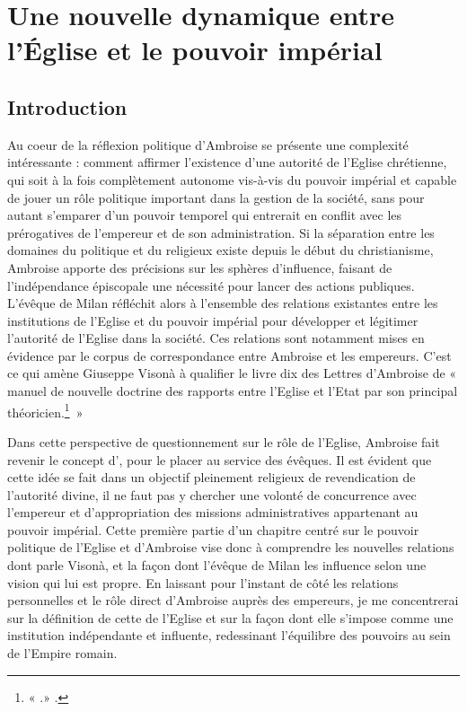 \section{Une nouvelle dynamique entre l'Église et le pouvoir impérial}

\subsection*{Introduction}

    Au coeur de la réflexion politique d’Ambroise se présente une complexité intéressante : comment affirmer l'existence d’une autorité de l’Eglise chrétienne, qui soit à la fois complètement autonome vis-à-vis du pouvoir impérial et capable de jouer un rôle politique important dans la gestion de la société, sans pour autant s'emparer d’un pouvoir temporel qui entrerait en conflit avec les prérogatives de l’empereur et de son administration. Si la séparation entre les domaines du politique et du religieux existe depuis le début du christianisme, Ambroise apporte des précisions sur les sphères d’influence, faisant de l’indépendance épiscopale une nécessité pour lancer des actions publiques. L’évêque de Milan réfléchit alors à l’ensemble des relations existantes entre les institutions de l’Eglise et du pouvoir impérial pour développer et légitimer l’autorité de l’Eglise dans la société. Ces relations sont notamment mises en évidence par le corpus de correspondance entre Ambroise et les empereurs. C’est ce qui amène Giuseppe Visonà à qualifier le livre dix des Lettres d'Ambroise de « manuel de nouvelle doctrine des rapports entre l’Eglise et l’Etat par son principal théoricien.\footnote{« .» \cite[33]{pizzolato_nec_timeo}.}~»

\bigskip

Dans cette perspective de questionnement sur le rôle de l’Eglise, Ambroise fait revenir le concept d’, pour le placer au service des évêques. Il est évident que cette idée se fait dans un objectif pleinement religieux de revendication de l’autorité divine, il ne faut pas y chercher une volonté de concurrence avec l’empereur et d’appropriation des missions administratives appartenant au pouvoir impérial. Cette première partie d’un chapitre centré sur le pouvoir politique de l’Eglise et d’Ambroise vise donc à comprendre les nouvelles relations dont parle Visonà, et la façon dont l’évêque de Milan les influence selon une vision qui lui est propre. En laissant pour l’instant de côté les relations personnelles et le rôle direct d’Ambroise auprès des empereurs, je me concentrerai sur la définition de cette  de l’Eglise et sur la façon dont elle s’impose comme une institution indépendante et influente, redessinant l’équilibre des pouvoirs au sein de l’Empire romain.

